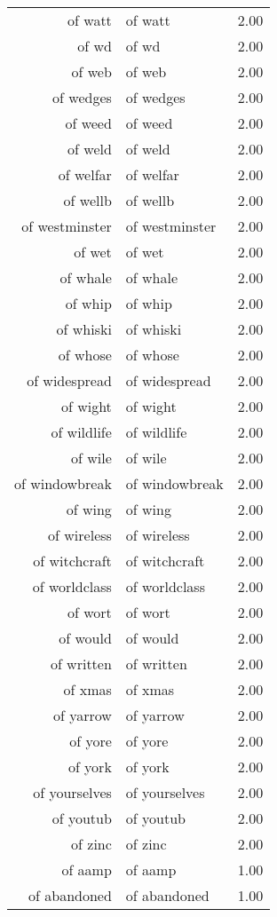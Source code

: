 \begin{table}[ht]
\begin{tabular}{rlr}
  of watt & of watt & 2.00 \\ 
  of wd & of wd & 2.00 \\ 
  of web & of web & 2.00 \\ 
  of wedges & of wedges & 2.00 \\ 
  of weed & of weed & 2.00 \\ 
  of weld & of weld & 2.00 \\ 
  of welfar & of welfar & 2.00 \\ 
  of wellb & of wellb & 2.00 \\ 
  of westminster & of westminster & 2.00 \\ 
  of wet & of wet & 2.00 \\ 
  of whale & of whale & 2.00 \\ 
  of whip & of whip & 2.00 \\ 
  of whiski & of whiski & 2.00 \\ 
  of whose & of whose & 2.00 \\ 
  of widespread & of widespread & 2.00 \\ 
  of wight & of wight & 2.00 \\ 
  of wildlife & of wildlife & 2.00 \\ 
  of wile & of wile & 2.00 \\ 
  of windowbreak & of windowbreak & 2.00 \\ 
  of wing & of wing & 2.00 \\ 
  of wireless & of wireless & 2.00 \\ 
  of witchcraft & of witchcraft & 2.00 \\ 
  of worldclass & of worldclass & 2.00 \\ 
  of wort & of wort & 2.00 \\ 
  of would & of would & 2.00 \\ 
  of written & of written & 2.00 \\ 
  of xmas & of xmas & 2.00 \\ 
  of yarrow & of yarrow & 2.00 \\ 
  of yore & of yore & 2.00 \\ 
  of york & of york & 2.00 \\ 
  of yourselves & of yourselves & 2.00 \\ 
  of youtub & of youtub & 2.00 \\ 
  of zinc & of zinc & 2.00 \\ 
  of aamp & of aamp & 1.00 \\ 
  of abandoned & of abandoned & 1.00 \\ 

\end{tabular}
\end{table}
